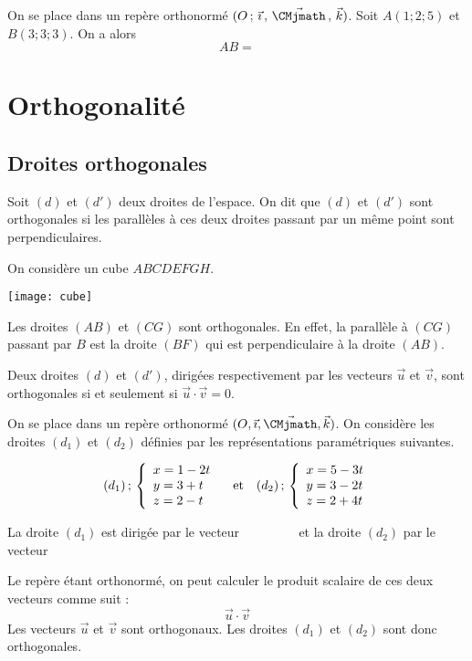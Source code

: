 \documentclass[11pt,fleqn, openany]{book} %
\begin{document}
\begin{example} On se place dans un repère orthonormé $\Oijk$. Soit $A(1;2;5)$ et $B(3;3;3)$. On a alors
\[ AB = \]\end{example}



\section{Orthogonalité}

\subsection{Droites orthogonales}

\begin{definition}Soit $(d)$ et $(d')$ deux droites de l'espace. On dit que $(d)$ et $(d')$ sont orthogonales si les parallèles à ces deux droites passant par un même point sont perpendiculaires.\end{definition}

\begin{example} On considère un cube $ABCDEFGH$.

\begin{center}
\texttt{[image: cube]}
\end{center}

Les droites $(AB)$ et $(CG)$ sont orthogonales. En effet, la parallèle à $(CG)$ passant par $B$ est la droite $(BF)$ qui est perpendiculaire à la droite $(AB)$.\end{example}
\newpage
\begin{proposition}Deux droites $(d)$ et $(d')$, dirigées respectivement par les vecteurs $\vec u$ et $\vec v$, sont orthogonales si et seulement si $\vec u \cdot \vec v = 0$.\end{proposition}

\begin{example}On se place dans un repère orthonormé $(O,\vec{\imath}, \vec{\CMjmath}, \vec k)$. On considère les droites $(d_1)$ et $(d_2)$ définies par les représentations paramétriques suivantes.

\[ (d_1)\, ; \, \left\{ \renewcommand{\arraystretch}{1}\begin{array}{l}x=1-2t\\y=3+t\\z=2-t\end{array}\right. \quad \text{et} \quad (d_2)\, ; \, \left\{ \renewcommand{\arraystretch}{1}\begin{array}{l}x=5-3t\\y=3-2t\\z=2+4t\end{array}\right.\]

La droite $(d_1)$ est dirigée par le vecteur $\qquad\qquad$ et la droite $(d_2)$  par le vecteur 
\vskip20pt

Le repère étant orthonormé, on peut calculer le produit scalaire de ces deux vecteurs comme suit :
\[ \vec u \cdot \vec v \]
Les vecteurs $\vec u$ et $\vec v$ sont orthogonaux. Les droites $(d_1)$ et $(d_2)$ sont donc orthogonales.\end{example}
\end{document}
